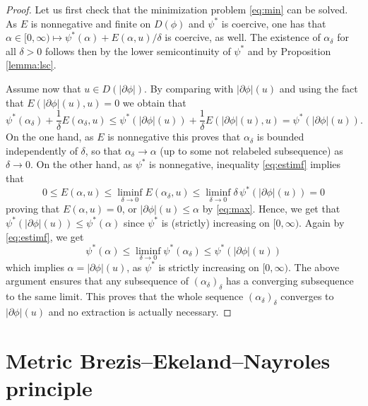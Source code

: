\documentclass[reqno]{amsart}
\renewcommand{\sl}{|\partial \phi|}
\begin{document}
   
 \begin{proof}
Let us first check that the minimization problem \eqref{eq:min}  can be solved.
   As $ E$ is nonnegative  and finite on $D(\phi)$  and $\psi^*$ is coercive, one has
   that $ \alpha \in [0,\infty) \mapsto \psi^*( \alpha) +  E(
   \alpha,u)/\delta$ is coercive, as well. The existence of $\alpha_\delta$ for
   all $\delta >0$
   follows then by the lower semicontinuity of $\psi^*$ and by
   Proposition \ref{lemma:lsc}.

   Assume now that $u \in D(\sl)$. By comparing with $\sl(u)$ and
   using the fact that $ E(\sl (u),u)=0$
   we obtain that 
   \begin{equation}\psi^*( \alpha_\delta) + \frac1\delta  E(
   \alpha_\delta,u) \leq \psi^*(\sl(u)) +\frac1\delta  E(\sl (u),u)   =
   \psi^*(\sl(u)).\label{eq:estimf}
   \end{equation}
   On the one hand, as $ E$ is nonnegative this proves that $\alpha_\delta$ is bounded
   independently of $\delta$, so that $\alpha_\delta \to \alpha$ (up to
   some not relabeled subsequence) as
   $\delta \to 0$. On the other hand, as $\psi^*$ is nonnegative, inequality \eqref{eq:estimf} implies that
   $$ 0\leq  E(\alpha,u) \leq \liminf_{\delta \to 0}
   E(\alpha_\delta, u) \leq \liminf_{\delta \to 0} \delta\, \psi^* (\sl(u))
   = 0$$
   proving that $ E(\alpha,u)=0$, or $\sl(u)\leq \alpha$ by \eqref{eq:max}. Hence, we get
   that $\psi^*(\sl(u))\leq \psi^*(\alpha)$ since $\psi^*$ is
   (strictly) increasing on $[0,\infty)$. Again by
   \eqref{eq:estimf}, we get
$$\psi^*(\alpha) \leq \liminf_{\delta \to 0}\psi^*(\alpha_\delta)
\leq \psi^*(\sl(u))$$
   which implies $\alpha = \sl(u)$, as $\psi^*$ is strictly
   increasing on $[0,\infty)$. The above argument  ensures  that any subsequence of
   $(\alpha_\delta)_\delta$ has a converging subsequence to the same
   limit. This proves that the whole sequence $(\alpha_\delta)_\delta$
   converges to
   $\sl (u)$ and
    no extraction is actually necessary.
  \end{proof}
  


\section{Metric  Brezis--Ekeland--Nayroles principle}
\label{sec:BEN}
\end{document}
